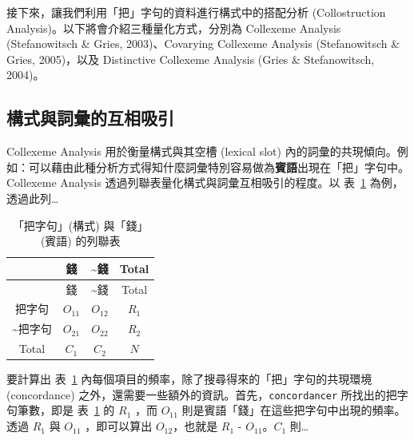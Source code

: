 接下來，讓我們利用「把」字句的資料進行構式中的搭配分析 (Collostruction
Analysis)。以下將會介紹三種量化方式，分別為 Collexeme Analysis
(Stefanowitsch \& Gries, 2003)、Covarying Collexeme Analysis
(Stefanowitsch \& Gries, 2005)，以及 Distinctive Collexeme Analysis
(Gries \& Stefanowitsch, 2004)。

\hypertarget{ux69cbux5f0fux8207ux8a5eux5f59ux7684ux4e92ux76f8ux5438ux5f15}{%
\subsection{構式與詞彙的互相吸引}\label{ux69cbux5f0fux8207ux8a5eux5f59ux7684ux4e92ux76f8ux5438ux5f15}}

Collexeme Analysis 用於衡量構式與其空槽 (lexical slot)
內的詞彙的共現傾向。例如：可以藉由此種分析方式得知什麼詞彙特別容易做為\textbf{賓語}出現在「把」字句中。Collexeme
Analysis 透過列聯表量化構式與詞彙互相吸引的程度。以
表~\ref{tbl:collexeme-analysis1} 為例，透過此列\ldots{}

\hypertarget{tbl:collexeme-analysis1}{}
\begin{longtable}[]{@{}cccc@{}}
\caption{\label{tbl:collexeme-analysis1}「把字句」(構式) 與「錢」(賓語)
的列聯表}\tabularnewline
\toprule()
& 錢 & \textasciitilde 錢 & Total \\
\midrule()
\endfirsthead
\toprule()
& 錢 & \textasciitilde 錢 & Total \\
\midrule()
\endhead
把字句 & \(O_{11}\) & \(O_{12}\) & \(R_{1}\) \\
\textasciitilde 把字句 & \(O_{21}\) & \(O_{22}\) & \(R_{2}\) \\
Total & \(C_{1}\) & \(C_{2}\) & \(N\) \\
\bottomrule()
\end{longtable}

要計算出 表~\ref{tbl:collexeme-analysis1}
內每個項目的頻率，除了搜尋得來的「把」字句的共現環境 (concordance)
之外，還需要一些額外的資訊。首先，\texttt{concordancer}
所找出的把字句筆數，即是 表~\ref{tbl:collexeme-analysis1} 的 \(R_{1}\)
，而 \(O_{11}\) 則是賓語「錢」在這些把字句中出現的頻率。透過 \(R_{1}\)
與 \(O_{11}\) ，即可以算出 \(O_{12}\)，也就是 \(R_{1}\) -
\(O_{11}\)。\(C_{1}\) 則\ldots{}

\begin{Shaded}
\begin{Highlighting}[]
\NormalTok{\{}
    \NormalTok{: \{ }
    \NormalTok{: \{ }
    \NormalTok{: \{ }
\NormalTok{\}}
\end{Highlighting}
\end{Shaded}

